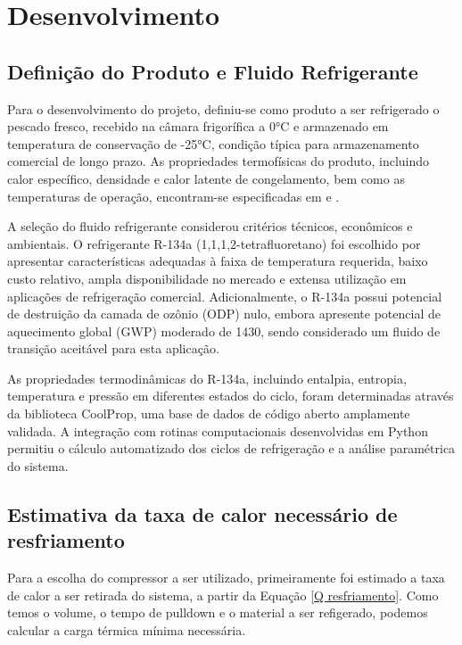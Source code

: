 \chapter{Desenvolvimento}

\section{Definição do Produto e Fluido Refrigerante}

Para o desenvolvimento do projeto, definiu-se como produto a ser refrigerado o pescado fresco, recebido na câmara frigorífica a 0°C e armazenado em temperatura de conservação de -25°C, condição típica para armazenamento comercial de longo prazo. As propriedades termofísicas do produto, incluindo calor específico, densidade e calor latente de congelamento, bem como as temperaturas de operação, encontram-se especificadas em \cite{calor_especifico_II} e \cite{costa1982refrigeracao}.

A seleção do fluido refrigerante considerou critérios técnicos, econômicos e ambientais. O refrigerante R-134a (1,1,1,2-tetrafluoretano) foi escolhido por apresentar características adequadas à faixa de temperatura requerida, baixo custo relativo, ampla disponibilidade no mercado e extensa utilização em aplicações de refrigeração comercial. Adicionalmente, o R-134a possui potencial de destruição da camada de ozônio (ODP) nulo, embora apresente potencial de aquecimento global (GWP) moderado de 1430, sendo considerado um fluido de transição aceitável para esta aplicação.

As propriedades termodinâmicas do R-134a, incluindo entalpia, entropia, temperatura e pressão em diferentes estados do ciclo, foram determinadas através da biblioteca CoolProp, uma base de dados de código aberto amplamente validada. A integração com rotinas computacionais desenvolvidas em Python permitiu o cálculo automatizado dos ciclos de refrigeração e a análise paramétrica do sistema.

\section{Estimativa da taxa de calor necessário de resfriamento}

Para a escolha do compressor a ser utilizado, primeiramente foi estimado a taxa de calor a ser retirada do sistema, a partir da Equação \ref{Q resfriamento}. Como temos o volume, o tempo de pulldown e o material a ser refigerado, podemos calcular a carga térmica mínima necessária.


